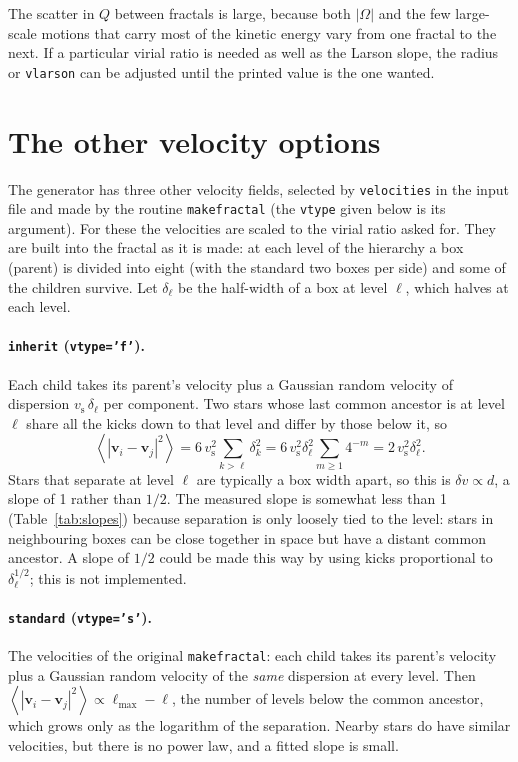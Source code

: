 \documentclass[11pt,a4paper]{article}
\newcommand{\bv}{\mathbf{v}}
\newcommand{\vs}{v_{\mathrm s}}
\newcommand{\avg}[1]{\left\langle #1 \right\rangle}
\begin{document}
The scatter in $Q$ between fractals is large, because both $|\Omega|$
and the few large-scale motions that carry most of the kinetic energy
vary from one fractal to the next. If a particular virial ratio is
needed as well as the Larson slope, the radius or \texttt{vlarson} can
be adjusted until the printed value is the one wanted.

\section{The other velocity options}

The generator has three other velocity fields, selected by
\texttt{velocities} in the input file and made by the routine
\texttt{makefractal} (the \texttt{vtype} given below is its argument).
For these the velocities are scaled to the virial ratio asked for. They are built into the fractal as
it is made: at each level of the hierarchy a box (parent) is divided
into eight (with the standard two boxes per side) and some of the
children survive. Let $\delta_\ell$ be the half-width of a box at level
$\ell$, which halves at each level.

\paragraph{\texttt{inherit} (\texttt{vtype='f'}).} Each child takes its
parent's velocity plus a Gaussian random velocity of dispersion
$\vs\,\delta_\ell$ per component. Two stars whose last common ancestor
is at level $\ell$ share all the kicks down to that level and differ by
those below it, so
\begin{equation}
  \avg{|\bv_i-\bv_j|^2} = 6\,\vs^2\sum_{k>\ell}\delta_k^2
  = 6\,\vs^2\delta_\ell^2\sum_{m\ge1}4^{-m} = 2\,\vs^2\delta_\ell^2 .
\end{equation}
Stars that separate at level $\ell$ are typically a box width apart, so
this is $\delta v \propto d$, a slope of 1 rather than $1/2$. The
measured slope is somewhat less than 1 (Table~\ref{tab:slopes}) because
separation is only loosely tied to the level: stars in neighbouring
boxes can be close together in space but have a distant common
ancestor. A slope of $1/2$ could be made this way by using kicks
proportional to $\delta_\ell^{1/2}$; this is not implemented.

\paragraph{\texttt{standard} (\texttt{vtype='s'}).} The velocities of
the original \texttt{makefractal}: each child takes its parent's
velocity plus a Gaussian random velocity of the \emph{same} dispersion
at every level. Then $\avg{|\bv_i-\bv_j|^2} \propto \ell_{\max}-\ell$,
the number of levels below the common ancestor, which grows only as the
logarithm of the separation. Nearby stars do have similar velocities,
but there is no power law, and a fitted slope is small.
\end{document}
